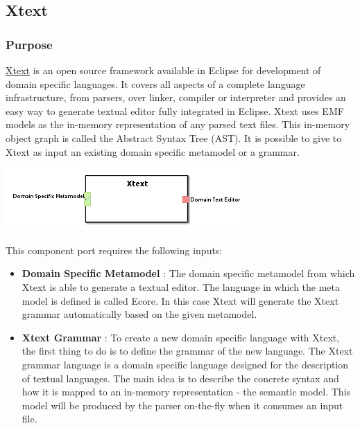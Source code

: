 \documentclass{gemoc} %
\begin{document}
\subsection{Xtext}


\subsubsection{Purpose}
\href{http://www.eclipse.org/Xtext}{Xtext} is an open source framework available in Eclipse for development of domain specific languages.
It covers all aspects of a complete language infrastructure, from parsers, over linker, compiler or interpreter and provides an easy way to generate textual editor fully integrated in Eclipse.
Xtext uses EMF models as the in-memory representation of any parsed text files. This in-memory object graph is called the Abstract Syntax Tree (AST).
It is possible to give to Xtext as input an existing domain specific metamodel or a grammar.

\begin{center}
\includegraphics*[trim=0.0cm 0.0cm 0cm 0.0cm, clip=true]{../images/generated/Generated_Xtext.png}
\end{center}

This component port requires the following inputs:
\begin{itemize}
  \item \textbf{Domain Specific Metamodel} :
The domain specific metamodel from which Xtext is able to generate a textual editor. The language in which the meta model is defined is called Ecore. In this case Xtext will generate the Xtext grammar automatically based on the given metamodel.
  \item \textbf{Xtext Grammar} :
To create a new domain specific language with Xtext, the first thing to do is to define the grammar of the new language. The Xtext grammar language is a domain specific language designed for the description of textual languages. The main idea is to describe the concrete syntax and how it is mapped to an in-memory representation - the semantic model. This model will be produced by the parser on-the-fly when it consumes an input file.
\end{itemize}
\end{document}
